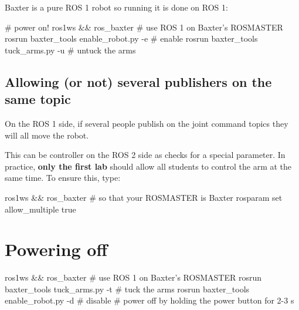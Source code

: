 \documentclass{ecnreport}
\begin{document}
Baxter is a pure ROS 1 robot so running it is done on ROS 1:
\begin{bashcodelarge}
 # power on!
 ros1ws && ros_baxter # use ROS 1 on Baxter's ROSMASTER
 rosrun baxter_tools enable_robot.py -e  # enable
 rosrun baxter_tools tuck_arms.py -u # untuck the arms
\end{bashcodelarge}

\subsection{Allowing (or not) several publishers on the same topic}

On the ROS 1 side, if several people publish on the joint command topics they will all move the robot.

This can be controller on the ROS 2 side as  checks for a special parameter. In practice, {\bf only the first lab} should allow all students to control the arm at the same time. To ensure this, type:
 \begin{bashcodelarge}
 ros1ws && ros_baxter # so that your ROSMASTER is Baxter
 rosparam set allow_multiple true
\end{bashcodelarge}

\section{Powering off}

\begin{bashcodelarge}
 ros1ws && ros_baxter # use ROS 1 on Baxter's ROSMASTER
 rosrun baxter_tools tuck_arms.py -t # tuck the arms
 rosrun baxter_tools enable_robot.py -d  # disable
 # power off by holding the power button for 2-3 s
\end{bashcodelarge}
\end{document}
